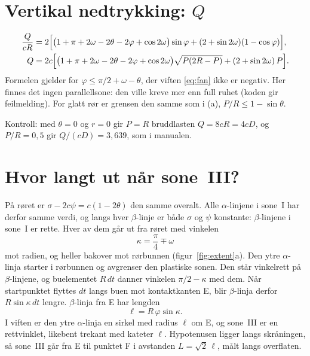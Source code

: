 \documentclass[11pt,a4paper]{article}
\begin{document}
\section{Vertikal nedtrykking: $Q$}

\begin{align}
  \frac{Q}{cR} &= 2\Bigl[\bigl(1 + \pi + 2\omega - 2\theta - 2\varphi + \cos 2\omega\bigr)\sin\varphi
                  + (2 + \sin 2\omega)(1-\cos\varphi)\Bigr], \\
  Q &= 2c\Bigl[\bigl(1 + \pi + 2\omega - 2\theta - 2\varphi + \cos 2\omega\bigr)\sqrt{P(2R-P)}
        + (2 + \sin 2\omega)\,P\Bigr].
\end{align}
Formelen gjelder for $\varphi \le \pi/2 + \omega - \theta$, der viften
\eqref{eq:fan} ikke er negativ.  Her finnes det ingen parallellsone: den
ville kreve mer enn full ruhet (koden gir feilmelding).  For glatt rør er
grensen den samme som i (a), $P/R \le 1 - \sin\theta$.

Kontroll: med $\theta = 0$ og $r = 0$ gir $P = R$ bruddlasten $Q = 8cR = 4cD$,
og $P/R = 0{,}5$ gir $Q/(cD) = 3{,}639$, som i manualen.

\section{Hvor langt ut når sone~III?}
\label{sec:extent}

På røret er $\sigma - 2c\psi = c(1 - 2\theta)$ den samme overalt.  Alle
$\alpha$-linjene i sone~I har derfor samme verdi, og langs hver $\beta$-linje
er både $\sigma$ og $\psi$ konstante: $\beta$-linjene i sone~I er rette.  Hver
av dem går ut fra røret med vinkelen
\begin{equation}
  \kappa = \frac{\pi}{4} \mp \omega
\end{equation}
mot radien, og heller bakover mot rørbunnen (figur~\ref{fig:extent}a).  Den
ytre $\alpha$-linja starter i rørbunnen og avgrenser den plastiske sonen.
Den står vinkelrett på $\beta$-linjene, og buelementet $R\,dt$ danner
vinkelen $\pi/2 - \kappa$ med dem.  Når startpunktet flyttes $dt$ langs buen
mot kontaktkanten E, blir $\beta$-linja derfor $R\sin\kappa\,dt$ lengre.
$\beta$-linja fra E har lengden
\begin{equation}
  \ell = R\,\varphi\sin\kappa .
\end{equation}
I viften er den ytre $\alpha$-linja en sirkel med radius $\ell$ om E, og
sone~III er en rettvinklet, likebent trekant med kateter $\ell$.
Hypotenusen ligger langs skråningen, så sone~III går fra E til punktet F i
avstanden $L = \sqrt2\,\ell$, målt langs overflaten.
\end{document}
